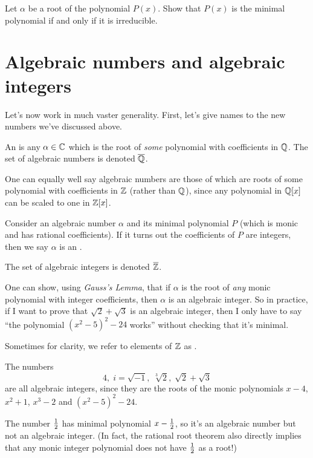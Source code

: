 \begin{ques}
	Let $\alpha$ be a root of the polynomial $P(x)$.
	Show that $P(x)$ is the minimal polynomial
	if and only if it is irreducible.
\end{ques}

\section{Algebraic numbers and algebraic integers}

Let's now work in much vaster generality.
First, let's give names to the new numbers we've discussed above.
\begin{definition}
	An  is any $\alpha \in \mathbb C$
	which is the root of \emph{some} polynomial with coefficients in $\mathbb Q$.
	The set of algebraic numbers is denoted $\overline{\mathbb Q}$.
\end{definition}
\begin{remark}
	One can equally well say algebraic numbers are those of which 
	are roots of some polynomial with coefficients in $\mathbb Z$ (rather than $\mathbb Q$),
	since any polynomial in $\mathbb Q[x]$ can be scaled to one in $\mathbb Z[x]$.
\end{remark}
\begin{definition}
	Consider an algebraic number $\alpha$ and
	its minimal polynomial $P$
	(which is monic and has rational coefficients).
	If it turns out the coefficients of $P$ are integers,
	then we say $\alpha$ is an .

	The set of algebraic integers is denoted $\overline{\mathbb Z}$.
\end{definition}
\begin{remark}
	One can show, using \emph{Gauss's Lemma}, that if $\alpha$ is the root
	of \emph{any} monic polynomial with integer coefficients,
	then $\alpha$ is an algebraic integer.
	So in practice, if I want to prove that $\sqrt 2 + \sqrt 3$ is an algebraic integer,
	then I only have to say ``the polynomial $(x^2-5)^2-24$ works''
	without checking that it's minimal.
\end{remark}
Sometimes for clarity, we refer to elements of $\mathbb Z$
as .
\begin{example}
	The numbers
	\[ 4, \; i = \sqrt{-1}, \; \sqrt[3]{2}, \; \sqrt2+\sqrt3 \]
	are all algebraic integers, since they are the roots of the monic polynomials
	$x-4$, $x^2+1$, $x^3-2$ and $(x^2-5)^2-24$.

	The number $\frac{1}{2}$ has minimal polynomial $x - \frac{1}{2}$,
	so it's an algebraic number but not an algebraic integer.
	(In fact, the rational root theorem also directly implies
	that any monic integer polynomial does not have $\frac{1}{2}$ as a root!)
\end{example}

